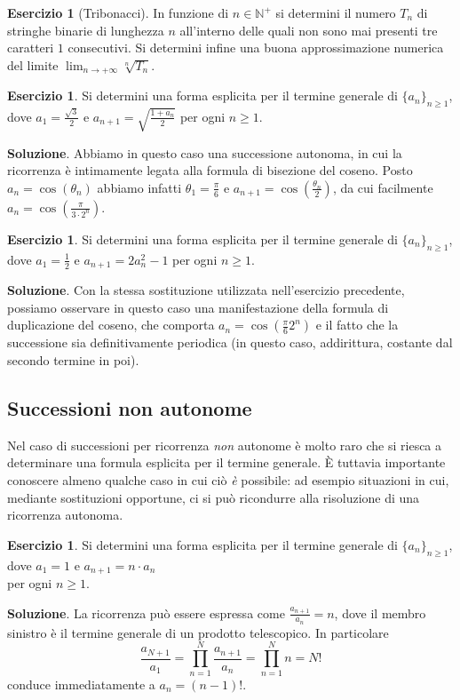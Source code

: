 \documentclass[a4paper,twoside]{article}
\newcommand{\N}{\mathbb{N}}
\theoremstyle{definition}
\newtheorem{ex}[theorem]{Esercizio}
\numberwithin{theorem}{section}
\begin{document}
\begin{ex}[Tribonacci] In funzione di $n\in\N^+$ si determini il numero $T_n$ di stringhe binarie di lunghezza $n$ all'interno delle quali non sono mai presenti tre caratteri $1$ consecutivi. Si determini infine una buona approssimazione numerica del limite $\lim_{n\to +\infty}\sqrt[n]{T_n}$.
\end{ex}

\begin{ex} Si determini una forma esplicita per il termine generale di $\{a_n\}_{n\geq 1}$, dove $a_1=\frac{\sqrt{3}}{2}$ e $a_{n+1}=\sqrt{\frac{1+a_n}{2}}$ per ogni $n\geq 1$.
\end{ex}
\textbf{Soluzione}. Abbiamo in questo caso una successione autonoma, in cui la ricorrenza è intimamente legata alla formula di bisezione del coseno. Posto $a_n=\cos(\theta_n)$ abbiamo infatti $\theta_1=\frac{\pi}{6}$ e $a_{n+1}=\cos\left(\frac{\theta_n}{2}\right)$, da cui facilmente $a_n=\cos\left(\frac{\pi}{3\cdot 2^n}\right)$.

\begin{ex} Si determini una forma esplicita per il termine generale di $\{a_n\}_{n\geq 1}$, dove $a_1=\frac{1}{2}$ e $a_{n+1}=2a_n^2-1$ per ogni $n\geq 1$.
\end{ex}
\textbf{Soluzione}. Con la stessa sostituzione utilizzata nell'esercizio precedente, possiamo osservare in questo caso una manifestazione della formula di duplicazione del coseno, che comporta $a_n=\cos\left(\frac{\pi}{6}2^n\right)$ e il fatto che la successione sia definitivamente periodica (in questo caso, addirittura, costante dal secondo termine in poi).

\subsection{Successioni non autonome}
Nel caso di successioni per ricorrenza \emph{non} autonome è molto raro che si riesca a determinare una formula esplicita per il termine generale. È tuttavia importante conoscere almeno qualche caso in cui ciò \emph{è} possibile: ad esempio situazioni in cui, mediante sostituzioni opportune, ci si può ricondurre alla risoluzione di una ricorrenza autonoma.

\begin{ex} Si determini una forma esplicita per il termine generale di $\{a_n\}_{n\geq 1}$, dove $a_1=1$ e $a_{n+1}=n\cdot a_n$\\ per ogni $n\geq 1$. 
\end{ex}
\textbf{Soluzione}. La ricorrenza può essere espressa come $\frac{a_{n+1}}{a_n}=n$, dove il membro sinistro è il termine generale di un prodotto telescopico. In particolare
$$ \frac{a_{N+1}}{a_1}=\prod_{n=1}^{N}\frac{a_{n+1}}{a_n} = \prod_{n=1}^{N}n = N!$$
conduce immediatamente a $a_n = (n-1)!$.
\end{document}
